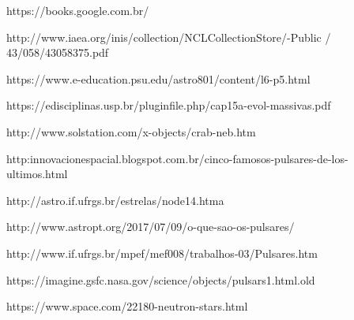 \documentclass[article,12pt,oneside,a4paper,english,brazil,sumario=tradicional]{abntex2}
\begin{document}
https://books.google.com.br/

http://www.iaea.org/inis/collection/NCLCollectionStore/-Public /  43/058/43058375.pdf

https://www.e-education.psu.edu/astro801/content/l6-p5.html

https://edisciplinas.usp.br/pluginfile.php/cap15a-evol-massivas.pdf

http://www.solstation.com/x-objects/crab-neb.htm

http:innovacionespacial.blogspot.com.br/cinco-famosos-pulsares-de-los-ultimos.html

http://astro.if.ufrgs.br/estrelas/node14.htma

http://www.astropt.org/2017/07/09/o-que-sao-os-pulsares/

http://www.if.ufrgs.br/mpef/mef008/trabalhos-03/Pulsares.htm

https://imagine.gsfc.nasa.gov/science/objects/pulsars1.html.old

https://www.space.com/22180-neutron-stars.html
\end{document}
